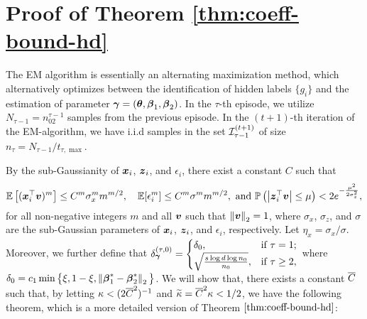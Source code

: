

\section{Proof of Theorem \ref{thm:coeff-bound-hd}} \label{sec:proof-coeff-bound}

The EM algorithm is essentially an alternating maximization method, which alternatively optimizes between the identification of hidden labels $\{g_i\}$ and the estimation of parameter $\boldsymbol{\gamma}=(\boldsymbol{\theta}, \boldsymbol{\beta}_1, \boldsymbol{\beta}_2)$.
In the $\tau$-th episode, we utilize $N_{\tau-1} = n_02^{\tau - 1}$ samples from the previous episode. 
In the $(t+1)$-th iteration of the EM-algorithm, we have i.i.d samples in the set ${\cal I}_{\tau-1}^{(t+1)}$ of size $n_{\tau}=N_{\tau-1}/t_{\tau, \max}$.

By the sub-Gaussianity of $\boldsymbol{x}_i$, $\boldsymbol{z}_i$, and $\epsilon_i$, there exist a constant $C$ such that \[\mathbb{E}\left[(\boldsymbol{x}_i^{\top}\boldsymbol{v})^{m}\right] \leq C^m \sigma_{x}^mm^{m/2}, \quad \mathbb{E}[\epsilon_{i}^m]\leq C^m \sigma^mm^{m/2},
\text{ and } 
\mathbb{P}\left( \left\lvert\boldsymbol{z}_i^{\top}\boldsymbol{v}\right\rvert \leq \mu \right) < 2e^{-\frac{\mu^2}{2\sigma^2_{z}}},\] 
for all non-negative integers $m$ and all $\boldsymbol{v}$ such that $\left\lVert\boldsymbol{v}\right\rVert_2=1$, where $\sigma_x$, $\sigma_z$, and $\sigma$ are the sub-Gaussian parameters of $\boldsymbol{x}_i$, $\boldsymbol{z}_i$, and $\epsilon_i$, respectively. Let $\eta_x =\sigma_x/\sigma$. Moreover, we further define that $\delta_{\boldsymbol{\gamma}}^{(\tau, 0)}=\begin{cases}
	\delta_{0}, & \text{if } \tau=1;\\
	 \sqrt{\frac{s\log d \log n_0}{n_0}}, & \text{if } \tau \geq 2,\end{cases}$
where $\delta_{0}=c_1\min\big\{\xi, 1-\xi, \left\lVert\boldsymbol{\beta}_1^*-\boldsymbol{\beta}_2^*\right\rVert_2\big\}$. We will show that, there exists a constant $\overline{C}$ such that, by letting $\kappa<(2\overline{C}^2)^{-1}$ and $\widetilde\kappa=\overline{C}^2\kappa<1/2$, we have the following theorem, which is a more detailed version of Theorem $\ref{thm:coeff-bound-hd}$:

